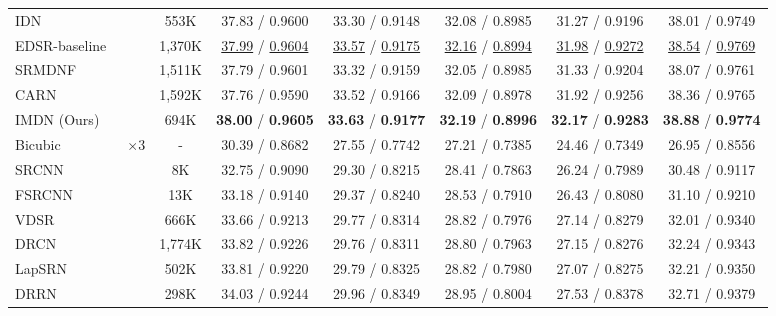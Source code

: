 \documentclass[sigconf]{acmart}
\begin{document}
\begin{table*}[htpb]
\begin{tabular}{|l|c|c|c|c|c|c|c|}
		IDN~\cite{IDN} &  & 553K & 37.83 / 0.9600 & 33.30 / 0.9148 & 32.08 / 0.8985 & 31.27 / 0.9196 & 38.01 / 0.9749 \\
		
		EDSR-baseline~\cite{EDSR} &  & 1,370K &\underline{37.99} / \underline{0.9604} & \underline{33.57} / \underline{0.9175} & \underline{32.16} / \underline{0.8994} & \underline{31.98} / \underline{0.9272} & \underline{38.54} / \underline{0.9769} \\
		
		SRMDNF~\cite{SRMDNF} &  & 1,511K & 37.79 / 0.9601 & 33.32 / 0.9159 & 32.05 / 0.8985 & 31.33 / 0.9204 & 38.07 / 0.9761 \\
		
		CARN~\cite{CARN} &  & 1,592K & 37.76 / 0.9590 & 33.52 / 0.9166 & 32.09 / 0.8978 & 31.92 / 0.9256 & 38.36 / 0.9765 \\
		
		IMDN (Ours) &  & 694K & \textbf{38.00} / \textbf{0.9605} & \textbf{33.63} / \textbf{0.9177} & \textbf{32.19} / \textbf{0.8996} & \textbf{32.17} / \textbf{0.9283} & \textbf{38.88} / \textbf{0.9774} \\
		\hline
		\hline
Bicubic & \multirow{13}{*}{$\times 3$} & - & 30.39 / 0.8682 & 27.55 / 0.7742 & 27.21 / 0.7385 & 24.46 / 0.7349 & 26.95 / 0.8556 \\
		
		SRCNN~\cite{SRCNN} &  & 8K & 32.75 / 0.9090 & 29.30 / 0.8215 & 28.41 / 0.7863 & 26.24 / 0.7989 & 30.48 / 0.9117\\
		
		FSRCNN~\cite{FSRCNN} &  & 13K & 33.18 / 0.9140 & 29.37 / 0.8240 & 28.53 / 0.7910 & 26.43 / 0.8080 & 31.10 / 0.9210 \\
		
		VDSR~\cite{VDSR} &  & 666K & 33.66 / 0.9213 & 29.77 / 0.8314 & 28.82 / 0.7976 & 27.14 / 0.8279 & 32.01 / 0.9340 \\
		
		DRCN~\cite{DRCN} &  & 1,774K & 33.82 / 0.9226 & 29.76 / 0.8311 & 28.80 / 0.7963 & 27.15 / 0.8276 & 32.24 / 0.9343 \\
		
		LapSRN~\cite{LapSRN} &  & 502K & 33.81 / 0.9220 & 29.79 / 0.8325 & 28.82 / 0.7980 & 27.07 / 0.8275 & 32.21 / 0.9350 \\
		
		DRRN~\cite{DRRN} &  & 298K & 34.03 / 0.9244 & 29.96 / 0.8349 & 28.95 / 0.8004 & 27.53 / 0.8378 & 32.71 / 0.9379 \\
		

\end{tabular}
\end{table*}
\end{document}
